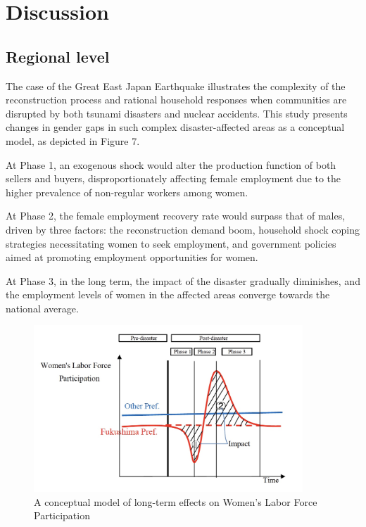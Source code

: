 \documentclass[12pt,halfline,a4paper]{ouparticle}
\begin{document}
\newpage

\section{Discussion}
\label{sec5}

\subsection{Regional level}
\label{sec5.1}

The case of the Great East Japan Earthquake illustrates the complexity of the reconstruction process and rational household responses when communities are disrupted by both tsunami disasters and nuclear accidents. This study presents changes in gender gaps in such complex disaster-affected areas as a conceptual model, as depicted in Figure 7.


At Phase 1, an exogenous shock would alter the production function of both sellers and buyers, disproportionately affecting female employment due to the higher prevalence of non-regular workers among women.

At Phase 2, the female employment recovery rate would surpass that of males, driven by three factors: the reconstruction demand boom, household shock coping strategies necessitating women to seek employment, and government policies aimed at promoting employment opportunities for women.

At Phase 3, in the long term, the impact of the disaster gradually diminishes, and the employment levels of women in the affected areas converge towards the national average.


\begin{figure}[h!]
    \centering
    \includegraphics[width=0.9\textwidth]{A conceptual model.jpeg}  %
    \caption{A conceptual model of long-term effects on Women's Labor Force Participation}
    \label{fig:conceptual_model}
\end{figure}
\end{document}
